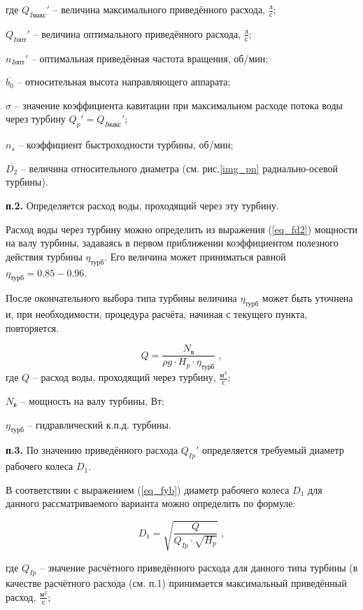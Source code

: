 \begin{landscape}
где $Q_{I\text{макс}}'$ -- величина максимального приведённого расхода, $\frac{\text{л}}{\text{с}}$; 

$Q_{I\text{опт}}'$ -- величина оптимального приведённого расхода, $\frac{\text{л}}{\text{с}}$;

$n_{I\text{опт}}'$  -- оптимальная приведённая частота вращения, об/мин;

$\overline{b_0}$ -- относительная высота направляющего аппарата;

$\sigma$ -- значение коэффициента кавитации при максимальном расходе потока воды через турбину $Q_p' = Q_{I\text{макс}}'$;

$n_s$ -- коэффициент быстроходности турбины, об/мин;

$\overline{D_2}$ -- величина относительного диаметра (см. рис.\ref{img_pn} радиально-осевой турбины).


\end{landscape}



\textbf{п.2.} Определяется расход воды, проходящий через эту турбину.

Расход воды через турбину можно определить из выражения (\ref{eq_fd2}) мощности на валу турбины, задаваясь в первом приближении коэффициентом полезного действия турбины $\eta_{\text{турб}}$. Его величина может приниматься равной $\eta_{\text{турб}} = 0.85 - 0.96$.

После окончательного выбора типа турбины величина $\eta_{\text{турб}}$ может быть уточнена и, при необходимости, процедура расчёта, начиная с текущего пункта, повторяется.

$$
   Q = \frac{N_{\text{в}}}{\rho g \cdot H_p \cdot \eta_{\text{турб}}} \; ,
$$
где $Q$ -- расход воды, проходящий через турбину, $\frac{\text{м}^3}{\text{с}}$;

$N_{\text{в}}$ -- мощность на валу турбины, Вт;

$\eta_{\text{турб}}$ -- гидравлический к.п.д. турбины.


\vspace{0.5cm}

\textbf{п.3.} По значению приведённого расхода $Q_{Ip}'$ определяется требуемый диаметр рабочего колеса $D_1$.


В соответствии с выражением (\ref{eq_fyb}) диаметр рабочего колеса $D_1$ для данного рассматриваемого варианта можно определить по формуле:

$$
   D_1 = \sqrt{\frac{Q}{Q_{Ip} \cdot \sqrt{H_p}}} \; ,
$$

где $Q_{Ip}$ -- значение расчётного приведённого расхода для данного типа турбины (в качестве расчётного расхода (см. п.1) принимается максимальный приведённый расход, $\frac{\text{м}^3}{\text{с}}$;

